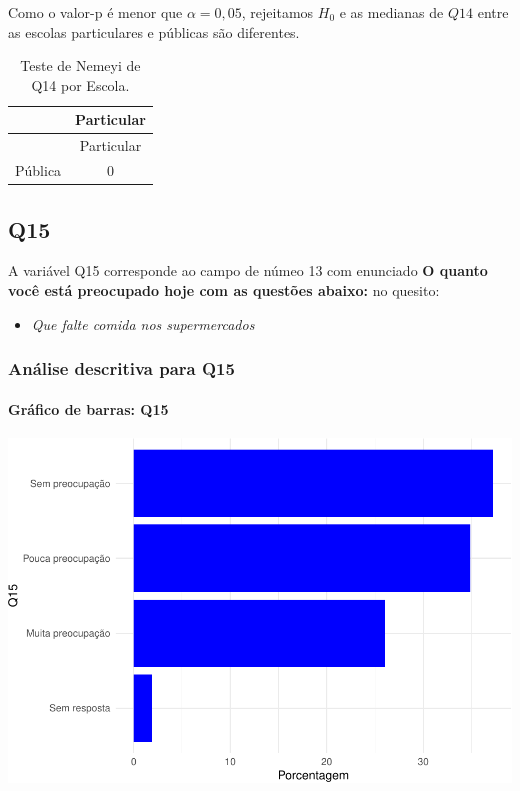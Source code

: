 \documentclass[]{article}
\providecommand{\tightlist}{%
  \setlength{\itemsep}{0pt}\setlength{\parskip}{0pt}}
\let\oldparagraph\paragraph
\renewcommand{\paragraph}[1]{\oldparagraph{#1}\mbox{}}
\begin{document}
Como o valor-p é menor que \(\alpha=0,05\), rejeitamos \(H_0\) e as medianas de \(Q14\) entre as escolas particulares e públicas são diferentes.

\begin{longtable}[]{@{}lc@{}}
\caption{\label{tab:unnamed-chunk-94}Teste de Nemeyi de Q14 por Escola.}\tabularnewline
\toprule
& Particular\tabularnewline
\midrule
\endfirsthead
\toprule
& Particular\tabularnewline
\midrule
\endhead
Pública & 0\tabularnewline
\bottomrule
\end{longtable}

\cleardoublepage

\hypertarget{q15}{%
\subsection{Q15}\label{q15}}

A variável Q15 corresponde ao campo de númeo 13 com enunciado \textbf{O quanto você está preocupado hoje com as questões abaixo:} no quesito:

\begin{itemize}
\tightlist
\item
  \emph{Que falte comida nos supermercados}
\end{itemize}

\hypertarget{anuxe1lise-descritiva-para-q15}{%
\subsubsection{Análise descritiva para Q15}\label{anuxe1lise-descritiva-para-q15}}

\hypertarget{gruxe1fico-de-barras-q15}{%
\paragraph{Gráfico de barras: Q15}\label{gruxe1fico-de-barras-q15}}

\begin{center}\includegraphics[width=0.75\linewidth]{relatorio_files/figure-latex/unnamed-chunk-95-1} \end{center}
\end{document}
